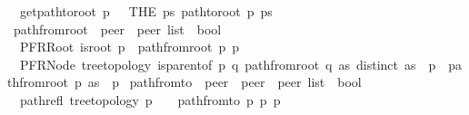 \begin{isabellebody}
\ \ {\isachardoublequoteopen}get{\isacharunderscore}{\kern0pt}path{\isacharunderscore}{\kern0pt}to{\isacharunderscore}{\kern0pt}root\ p\ {\isasymequiv}\ \ {\isacharparenleft}{\kern0pt}THE\ ps{\isachardot}{\kern0pt}\ path{\isacharunderscore}{\kern0pt}to{\isacharunderscore}{\kern0pt}root\ p\ ps{\isacharparenright}{\kern0pt}{\isachardoublequoteclose}\isanewline
\isanewline
{}\isamarkupfalse%
\ path{\isacharunderscore}{\kern0pt}from{\isacharunderscore}{\kern0pt}root\ {\isacharcolon}{\kern0pt}{\isacharcolon}{\kern0pt}\ {\isachardoublequoteopen}{\isacharprime}{\kern0pt}peer\ {\isasymRightarrow}\ {\isacharprime}{\kern0pt}peer\ list\ {\isasymRightarrow}\ bool{\isachardoublequoteclose}\ \isanewline
\ \ PFRRoot{\isacharcolon}{\kern0pt}\ {\isachardoublequoteopen}{\isasymlbrakk}is{\isacharunderscore}{\kern0pt}root\ p{\isasymrbrakk}\ {\isasymLongrightarrow}\ path{\isacharunderscore}{\kern0pt}from{\isacharunderscore}{\kern0pt}root\ p\ {\isacharbrackleft}{\kern0pt}p{\isacharbrackright}{\kern0pt}{\isachardoublequoteclose}\ {\isacharbar}{\kern0pt}\isanewline
\ \ PFRNode{\isacharcolon}{\kern0pt}\ {\isachardoublequoteopen}{\isasymlbrakk}tree{\isacharunderscore}{\kern0pt}topology{\isacharsemicolon}{\kern0pt}\ is{\isacharunderscore}{\kern0pt}parent{\isacharunderscore}{\kern0pt}of\ p\ q{\isacharsemicolon}{\kern0pt}\ path{\isacharunderscore}{\kern0pt}from{\isacharunderscore}{\kern0pt}root\ q\ as{\isacharsemicolon}{\kern0pt}\ distinct\ {\isacharparenleft}{\kern0pt}as\ {\isacharat}{\kern0pt}\ {\isacharbrackleft}{\kern0pt}p{\isacharbrackright}{\kern0pt}{\isacharparenright}{\kern0pt}{\isasymrbrakk}\ {\isasymLongrightarrow}\ path{\isacharunderscore}{\kern0pt}from{\isacharunderscore}{\kern0pt}root\ p\ {\isacharparenleft}{\kern0pt}as\ {\isacharat}{\kern0pt}\ {\isacharbrackleft}{\kern0pt}p{\isacharbrackright}{\kern0pt}{\isacharparenright}{\kern0pt}{\isachardoublequoteclose}\isanewline
\isanewline
{}\isamarkupfalse%
\ path{\isacharunderscore}{\kern0pt}from{\isacharunderscore}{\kern0pt}to\ {\isacharcolon}{\kern0pt}{\isacharcolon}{\kern0pt}\ {\isachardoublequoteopen}{\isacharprime}{\kern0pt}peer\ {\isasymRightarrow}\ {\isacharprime}{\kern0pt}peer\ {\isasymRightarrow}\ {\isacharprime}{\kern0pt}peer\ list\ {\isasymRightarrow}\ bool{\isachardoublequoteclose}\ \isanewline
\ \ path{\isacharunderscore}{\kern0pt}refl{\isacharcolon}{\kern0pt}\ {\isachardoublequoteopen}{\isasymlbrakk}tree{\isacharunderscore}{\kern0pt}topology{\isacharsemicolon}{\kern0pt}\ p\ {\isasymin}\ {\isasymP}{\isasymrbrakk}\ {\isasymLongrightarrow}\ path{\isacharunderscore}{\kern0pt}from{\isacharunderscore}{\kern0pt}to\ p\ p\ {\isacharbrackleft}{\kern0pt}p{\isacharbrackright}{\kern0pt}{\isachardoublequoteclose}\ {\isacharbar}{\kern0pt}\isanewline

\end{isabellebody}
